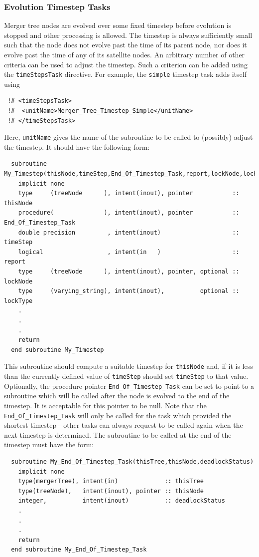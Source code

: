 \subsubsection{Evolution Timestep Tasks}

Merger tree nodes are evolved over some fixed timestep before evolution is stopped and other processing is allowed. The timestep is always sufficiently small such that the node does not evolve past the time of its parent node, nor does it evolve past the time of any of its satellite nodes. An arbitrary number of other criteria can be used to adjust the timestep. Such a criterion can be added using the {\tt timeStepsTask} directive. For example, the {\tt simple} timestep task adds itself using
\begin{verbatim}
 !# <timeStepsTask>
 !#  <unitName>Merger_Tree_Timestep_Simple</unitName>
 !# </timeStepsTask>
\end{verbatim}
Here, {\tt unitName} gives the name of the subroutine to be called to (possibly) adjust the timestep. It should have the following form:
\begin{verbatim}
  subroutine My_Timestep(thisNode,timeStep,End_Of_Timestep_Task,report,lockNode,lockType)
    implicit none
    type     (treeNode      ), intent(inout), pointer           :: thisNode
    procedure(              ), intent(inout), pointer           :: End_Of_Timestep_Task
    double precision         , intent(inout)                    :: timeStep
    logical                  , intent(in   )                    :: report
    type     (treeNode      ), intent(inout), pointer, optional :: lockNode
    type     (varying_string), intent(inout),          optional :: lockType
    .
    .
    .
    return
  end subroutine My_Timestep
\end{verbatim}
This subroutine should compute a suitable timestep for {\tt thisNode} and, if it is less than the currently defined value of {\tt timeStep} should set {\tt timeStep} to that value. Optionally, the procedure pointer {\tt End\_Of\_Timestep\_Task} can be set to point to a subroutine which will be called after the node is evolved to the end of the timestep. It is acceptable for this pointer to be null. Note that the {\tt End\_Of\_Timestep\_Task} will only be called for the task which provided the shortest timestep---other tasks can always request to be called again when the next timestep is determined. The subroutine to be called at the end of the timestep must have the form:
\begin{verbatim}
  subroutine My_End_Of_Timestep_Task(thisTree,thisNode,deadlockStatus)
    implicit none
    type(mergerTree), intent(in)             :: thisTree
    type(treeNode),   intent(inout), pointer :: thisNode
    integer,          intent(inout)          :: deadlockStatus
    .
    .
    .
    return
  end subroutine My_End_Of_Timestep_Task
\end{verbatim}
